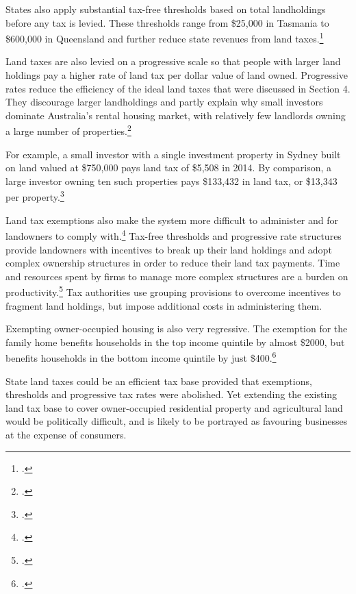 \documentclass[twoside,english]{grattanBudgetRepairb5portrait}
\begin{document}
States also apply substantial tax-free thresholds based on total landholdings before any tax is levied. These thresholds range from \$25,000 in Tasmania to \$600,000 in Queensland and further reduce state revenues from land taxes.\footcite[][31--33]{Treasury2014-Interstate-Comparison-Taxes1415}   

Land taxes are also levied on a progressive scale\label{paragraph:PROP-land-taxes-levied-on-progressive-scale} so that people with larger land holdings pay a higher rate of land tax per dollar value of land owned. Progressive rates reduce the efficiency of the ideal land taxes that were discussed in Section 4. They discourage larger landholdings and partly explain why small investors dominate Australia’s rental housing market, with relatively few landlords owning a large number of properties.\footcites{Berry2000}{WoodOngStewart2010}[][261]{HenryTaxReview2010}

For example, a small investor with a single investment property in Sydney built on land valued at \$750,000 pays land tax of \$5,508 in 2014. By comparison, a large investor owning ten such properties pays \$133,432 in land tax, or \$13,343 per property.\footcite[][31--33]{Treasury2014-Interstate-Comparison-Taxes1415} 

Land tax exemptions also make the system more difficult to administer and for landowners to comply with.\footcite[][261]{HenryTaxReview2010}  Tax-free thresholds and progressive rate structures provide landowners with incentives to break up their land holdings and adopt complex ownership structures in order to reduce their land tax payments. Time and resources spent by firms to manage more complex structures are a burden on productivity.\footcite[][157]{GabbitasEldridge1998}  Tax authorities use grouping provisions to overcome incentives to fragment land holdings, but impose additional costs in administering them. 

Exempting owner-occupied housing is also very regressive. The exemption for the family home benefits households in the top income quintile by almost \$2000, but benefits households in the bottom income quintile by just \$400.\footcite[][27]{KellyMaresHarrisonEtAl2013}   

State land taxes could be an efficient tax base provided that exemptions, thresholds and progressive tax rates were abolished. Yet extending the existing land tax base to cover owner-occupied residential property and agricultural land would be politically difficult, and is likely to be portrayed as favouring businesses at the expense of consumers.
\end{document}
